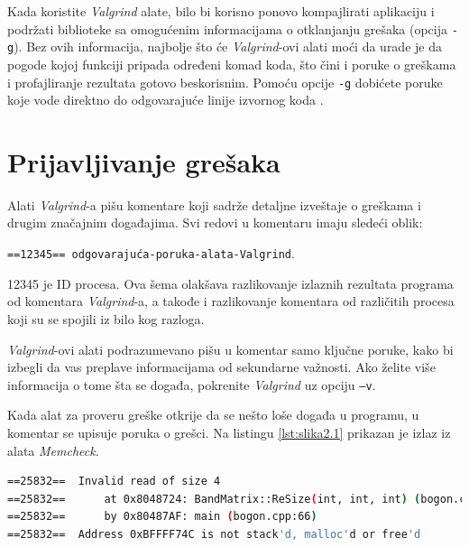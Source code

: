 \documentclass[12pt,oneside]{memoir}
\theoremstyle{plain}
\theoremstyle{definition}
\begin{document}
Kada koristite \textit{Valgrind} alate, bilo bi korisno ponovo kompajlirati aplikaciju i podržati biblioteke sa omogućenim informacijama o otklanjanju grešaka (opcija \texttt{-g}). Bez ovih informacija, najbolje što će \textit{Valgrind}-ovi alati  moći da urade je da pogode kojoj funkciji pripada određeni komad koda, što čini i poruke o greškama i profajliranje rezultata gotovo beskorisnim. Pomoću opcije \texttt{-g} dobićete poruke koje vode direktno do odgovarajuće linije izvornog koda \cite{ValgrindCore}.

\section{Prijavljivanje grešaka}
Alati \textit{Valgrind}-a pišu komentare koji sadrže detaljne izveštaje o greškama i drugim značajnim događajima. Svi redovi u komentaru imaju sledeći oblik:
\begin{center}
\texttt{==12345== odgovarajuća-poruka-alata-Valgrind}.
\end{center}
12345 je ID procesa. Ova šema olakšava razlikovanje izlaznih rezultata programa od komentara \textit{Valgrind}-a, a takođe i razlikovanje komentara od različitih procesa koji su se spojili iz bilo kog razloga.

\textit{Valgrind}-ovi alati podrazumevano pišu u komentar samo ključne poruke, kako bi izbegli da vas preplave informacijama od sekundarne važnosti. Ako želite više informacija o tome šta se događa, pokrenite \textit{Valgrind} uz opciju \texttt{–v}.

Kada alat za proveru greške otkrije da se nešto loše događa u programu, u komentar se upisuje poruka o grešci. Na listingu \ref{lst:slika2.1} prikazan je izlaz iz alata \textit{Memcheck}.

\begin{lstlisting}[style=terminal,caption={Primer izlaza alta \textit{Memcheck}, izvor: \cite{ValgrindCore}}, label={lst:slika2.1},language={bash}]   
==25832==  Invalid read of size 4
==25832==      at 0x8048724: BandMatrix::ReSize(int, int, int) (bogon.cpp:45)
==25832==      by 0x80487AF: main (bogon.cpp:66)
==25832==  Address 0xBFFFF74C is not stack'd, malloc'd or free'd
\end{lstlisting}
\end{document}
